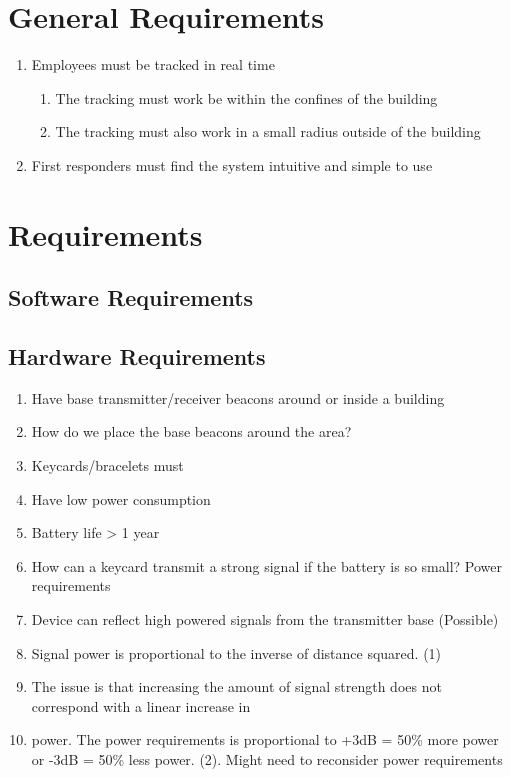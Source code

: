 
\section{General Requirements}
	\begin{enumerate}
		\item Employees must be tracked in real time
			\begin{enumerate}
				\item The tracking must work be within the confines of the building
				\item The tracking must also work in a small radius outside of the building
			\end{enumerate}
		\item First responders must find the system intuitive and simple to use
	\end{enumerate}

\section{Requirements}


\subsection{Software Requirements}

\subsection{Hardware Requirements}

	\begin{enumerate}
		\item Have base transmitter/receiver beacons around or inside a building
		\item How do we place the base beacons around the area?
		\item Keycards/bracelets must
		\item Have low power consumption
		\item Battery life > 1 year
		\item How can a keycard transmit a strong signal if the battery is so small? Power requirements
		\item Device can reflect high powered signals from the transmitter base (Possible)
		\item Signal power is proportional to the inverse of distance squared. (1)
		\item The issue is that increasing the amount of signal strength does not correspond with a linear increase in
		\item power. The power requirements is proportional to +3dB = 50\% more power or -3dB = 50\% less power. (2). Might need to reconsider power requirements
	\end{enumerate}

